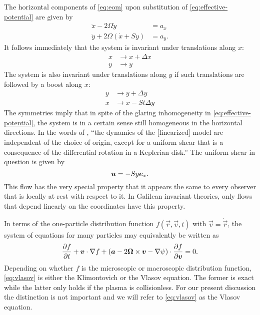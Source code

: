 \documentclass[aps,pre,notitlepage,amsmath,amssymb,amsfonts,nobibnotes,nofootinbib,superscriptaddress,onecolumn,a4paper,10pt]{revtex4-1}
\begin{document}
The horizontal components of \cref{eq:eom} upon substitution of
\cref{eq:effective-potential} are given by
\begin{align}
  \ddot{x} - 2\Omega\dot{y} &= a_x \\
  \label{eq:eom-y}
  \ddot{y} + 2\Omega(\dot{x} + Sy) &= a_y.
\end{align}
It follows immediately that the system is invariant under translations along
$x$:
\begin{equation}
  \label{eq:trans-x}
  \begin{aligned}
    x &\to x + \Delta x \\
    y &\to y
  \end{aligned}
\end{equation}
The system is also invariant under translations along $y$ if such translations
are followed by a boost along $x$:
\begin{equation}
  \label{eq:trans-y}
  \begin{aligned}
    y &\to y + \Delta y \\
    x &\to x - St\Delta y
  \end{aligned}
\end{equation}
The symmetries  imply that in spite of the
glaring inhomogeneity in \cref{eq:effective-potential}, the system is in a
certain sense still homogeneous in the horizontal directions. In the words of
\citet{Wisdom1988}, ``the dynamics of the [linearized] model are independent
of the choice of origin, except for a uniform shear that is a consequence of
the differential rotation in a Keplerian disk.'' The uniform shear in question
is given by
\begin{equation}
  \label{eq:shear-flow}
  \bm{u} = -Sy\bm{e}_x.
\end{equation}
This flow has the very special property that it appears the same to every
observer that is locally at rest with respect to it. In Galilean invariant
theories, only flows that depend linearly on the coordinates have this
property.

In terms of the one-particle distribution function $f(\vec{r},\vec{v},t)$ with
$\vec{v}=\dot{\vec{r}}$, the system of equations  for many
particles may equivalently be written as
\begin{equation}
  \label{eq:vlasov}
  \frac{\partial f}{\partial t} + \bm{v}\cdot\nabla f
  + (\bm{a} - 2\bm{\Omega}\times\bm{v} - \nabla\psi)\cdot\frac{\partial f}{\partial\bm{v}}
  = 0.
\end{equation}
Depending on whether $f$ is the microscopic or macroscopic distribution
function, \cref{eq:vlasov} is either the Klimontovich or the Vlasov equation.
The former is exact while the latter only holds if the plasma is
collisionless. For our present discussion the distinction is not important and
we will refer to \cref{eq:vlasov} as the Vlasov equation.
\end{document}
